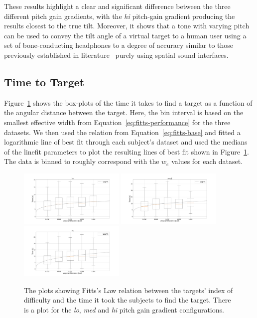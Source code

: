 \documentclass[format=sigconf, review=true, screen=true, anonymous=true]{acmart}
\begin{document}
These results highlight a clear and significant difference between the three different pitch gain gradients, with the \emph{hi} pitch-gain gradient producing the results closest to the true tilt. Moreover, it shows that a tone with varying pitch can be used to convey the tilt angle of a virtual target to a human user using a set of bone-conducting headphones to a degree of accuracy similar to those previously established in literature~\cite{bujacz2011sonification, katz2011spatial, zotkin2004rendering} purely using spatial sound interfaces.

\subsection{Time to Target}

Figure~\ref{fig:fitts} shows the box-plots of the time it takes to find a target as a function of the angular distance between the target. Here, the bin interval is based on the smallest effective width from Equation~\ref{eq:fitts-performance} for the three datasets. We then used the relation from Equation~\ref{eq:fitts-base} and fitted a logarithmic line of best fit through each subject's dataset and used the medians of the linefit parameters to plot the resulting lines of best fit shown in Figure~\ref{fig:fitts}. The data is binned to roughly correspond with the $w_e$ values for each dataset.

\begin{figure}
  \centering
  \includegraphics[width=0.45\textwidth]{figures/fitts_lo.png}
  \includegraphics[width=0.45\textwidth]{figures/fitts_med.png}
  \includegraphics[width=0.45\textwidth]{figures/fitts_hi.png}
  \caption{The plots showing Fitts's Law relation between the targets' index of difficulty and the time it took the subjects to find the target. There is a plot for the \emph{lo}, \emph{med} and \emph{hi} pitch gain gradient configurations.} 
  \label{fig:fitts}
\end{figure}
\end{document}
